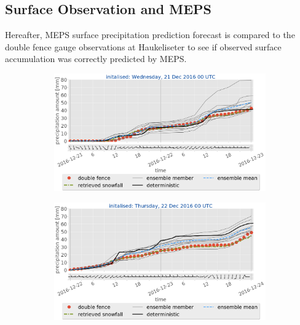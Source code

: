 \subsection{Surface Observation and MEPS}\label{sec:sfc_acc}
Hereafter, MEPS surface precipitation prediction forecast is compared to the double fence gauge observations at Haukeliseter to see if observed surface accumulation was correctly predicted by MEPS.
\begin{figure}[H]
	\centering
	\begin{subfigure}[t]{0.97\textwidth}		\includegraphics[trim={0.cm 5.2cm 0.cm 0cm},clip,width=\textwidth]{./fig_sfc_acc/acc_wind_20161221_00}
		\caption{}\label{fig:sfc_acc21}
	\end{subfigure}
	\begin{subfigure}[t]{0.97\textwidth}		\includegraphics[trim={0.cm 5.2cm 0.cm 0cm},clip,width=\textwidth]{./fig_sfc_acc/acc_wind_20161222_00}
		\caption{}\label{fig:sfc_acc22}
	\end{subfigure}

\end{figure}
